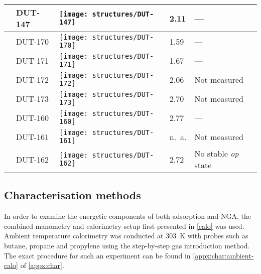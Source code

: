 \begin{table}[p]
\begin{tabularx}{\linewidth}{M{1cm} | Y >{\centering}m{5cm} Y p{2.5cm}}
        & DUT-147  & 
            \texttt{[image: structures/DUT-147]}
            & 2.11 & --- \\
        \midrule
         &
        DUT-170  & 
            \texttt{[image: structures/DUT-170]}
            & 1.59 & --- \\
        & DUT-171  & 
            \texttt{[image: structures/DUT-171]}
            & 1.67 & --- \\
        & DUT-172  & 
            \texttt{[image: structures/DUT-172]}
            & 2.06 & Not measured \\
        & DUT-173  & 
            \texttt{[image: structures/DUT-173]}
            & 2.70 & Not measured \\
        \midrule
         &
        DUT-160  & 
            \texttt{[image: structures/DUT-160]}
            & 2.77 & --- \\
        & DUT-161  & 
            \texttt{[image: structures/DUT-161]}
            & n.\ a. & Not measured \\
        & DUT-162  & 
            \texttt{[image: structures/DUT-162]}
            & 2.72 & No stable \textit{op} state \\
        \bottomrule
	\end{tabularx}%
	\label{dut:tbl:materials}
\end{table}%

\subsection{Characterisation methods}

In order to examine the energetic components of both adsorption and 
NGA, the combined manometry and calorimetry setup first 
presented in \autoref{calo} was used. Ambient temperature calorimetry
was conducted at \SI{303}{\kelvin} with probes such as butane, propane
and propylene using the step-by-step gas introduction method. 
The exact procedure for such an experiment can be found in 
\autoref{appx:char:ambient-calo} of \autoref{appx:char}.


